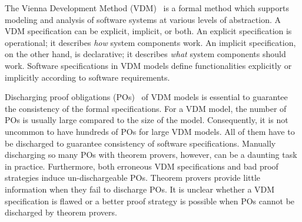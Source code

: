 The Vienna Development Method (VDM)~\cite{Jones:1990:SSD:94062} is a formal method which supports modeling and analysis of software systems at various levels of abstraction. A VDM specification can be explicit, implicit, or both. An explicit specification is operational; it describes \emph{how} system components work. An implicit specification, on the other hand, is declarative; it describes \emph{what} system components should work. Software specifications in VDM models define functionalities explicitly or implicitly according to software requirements. 


Discharging proof obligations (POs)~\cite{AL:97:POGV} of VDM models is essential to guarantee the consistency of the formal specifications. For a VDM model, the number of POs is usually large compared to the size of the model. 
Consequently, it is not uncommon to have hundreds of POs for large VDM models. All of them have to be discharged to guarantee consistency of software specifications. Manually discharging so many POs with theorem provers, however, can be a daunting task in practice. Furthermore, both erroneous VDM specifications and bad proof strategies induce un-dischargeable POs. Theorem provers provide little information when they fail to discharge POs. It is unclear whether a VDM specification is flawed or a better proof strategy is possible when POs cannot be discharged by theorem provers.

